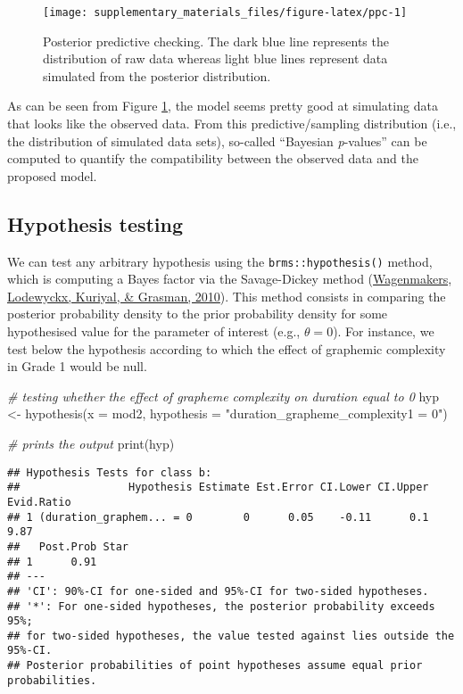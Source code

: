 \documentclass[
  11pt,
  english,
  ,doc,mask,floatsintext]{apa6}
\newenvironment{Shaded}{}{}
\newcommand{\AttributeTok}[1]{\textcolor[rgb]{0.49,0.56,0.16}{#1}}
\newcommand{\CommentTok}[1]{\textcolor[rgb]{0.38,0.63,0.69}{\textit{#1}}}
\newcommand{\FunctionTok}[1]{\textcolor[rgb]{0.02,0.16,0.49}{#1}}
\newcommand{\NormalTok}[1]{#1}
\newcommand{\OtherTok}[1]{\textcolor[rgb]{0.00,0.44,0.13}{#1}}
\newcommand{\StringTok}[1]{\textcolor[rgb]{0.25,0.44,0.63}{#1}}
\begin{document}
\begin{figure}[!htb]

{\centering \texttt{[image: supplementary\_materials\_files/figure-latex/ppc-1]} 

}

\caption{Posterior predictive checking. The dark blue line represents the distribution of raw data whereas light blue lines represent data simulated from the posterior distribution.}\label{fig:ppc}
\end{figure}

As can be seen from Figure \ref{fig:ppc}, the model seems pretty good at simulating data that looks like the observed data. From this predictive/sampling distribution (i.e., the distribution of simulated data sets), so-called ``Bayesian \emph{p}-values'' can be computed to quantify the compatibility between the observed data and the proposed model.

\newpage

\hypertarget{hypothesis-testing}{%
\subsection{Hypothesis testing}\label{hypothesis-testing}}

We can test any arbitrary hypothesis using the \texttt{brms::hypothesis()} method, which is computing a Bayes factor via the Savage-Dickey method (\protect\hyperlink{ref-wagenmakers_bayesian_2010}{Wagenmakers, Lodewyckx, Kuriyal, \& Grasman, 2010}). This method consists in comparing the posterior probability density to the prior probability density for some hypothesised value for the parameter of interest (e.g., \(\theta = 0\)). For instance, we test below the hypothesis according to which the effect of graphemic complexity in Grade 1 would be null.

\begin{Shaded}
\begin{Highlighting}[]
\CommentTok{\# testing whether the effect of grapheme complexity on duration equal to 0}
\NormalTok{hyp }\OtherTok{\textless{}{-}} \FunctionTok{hypothesis}\NormalTok{(}\AttributeTok{x =}\NormalTok{ mod2, }\AttributeTok{hypothesis =} \StringTok{"duration\_grapheme\_complexity1 = 0"}\NormalTok{)}

\CommentTok{\# prints the output}
\FunctionTok{print}\NormalTok{(hyp)}
\end{Highlighting}
\end{Shaded}

\begin{verbatim}
## Hypothesis Tests for class b:
##                 Hypothesis Estimate Est.Error CI.Lower CI.Upper Evid.Ratio
## 1 (duration_graphem... = 0        0      0.05    -0.11      0.1       9.87
##   Post.Prob Star
## 1      0.91     
## ---
## 'CI': 90%-CI for one-sided and 95%-CI for two-sided hypotheses.
## '*': For one-sided hypotheses, the posterior probability exceeds 95%;
## for two-sided hypotheses, the value tested against lies outside the 95%-CI.
## Posterior probabilities of point hypotheses assume equal prior probabilities.
\end{verbatim}
\end{document}
